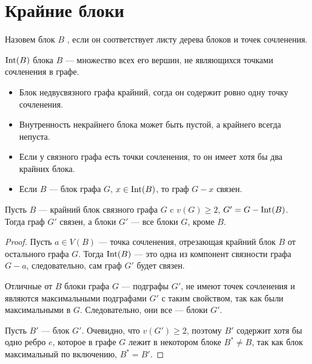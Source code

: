 \section{Крайние блоки}

\begin{definition}
    Назовем блок $B$ , если он соответствует листу дерева блоков и точек сочленения.
\end{definition}
\begin{definition}
     $\operatorname{Int}(B)$ блока $B$ --- множество всех его вершин, не являющихся точками сочленения в графе.
\end{definition}
\begin{itemize}
	\item Блок недвусвязного графа крайний, согда он содержит ровно одну точку сочленения.
	\item Внутренность некрайнего блока может быть пустой, а крайнего всегда непуста.
	\item Если у связного графа есть точки сочленения, то он имеет хотя бы два крайних блока.
	\item Если $B$ ---  блок графа $G$, $x \in \operatorname{Int}(B)$, то граф $G-x$ связен.
\end{itemize}
\begin{lemma}\label{lm:connectivity_3}
    Пусть $B$ --- крайний блок связного графа $G$ c $v(G) \ge 2$, $G' = G - \operatorname{Int}(B)$. Тогда граф $G'$ связен, а блоки $G'$ --- все блоки $G$, кроме $B$.
\end{lemma}
\begin{proof}
    Пусть $a \in V(B)$ --- точка сочленения, отрезающая крайний блок $B$ от остального графа $G$. Тогда $\operatorname{Int}(B)$ --- это одна из компонент связности графа  $G-a$, следовательно, сам граф $G'$ будет связен.

	Отличные от $B$ блоки графа $G$ --- подграфы $G'$, не имеют точек сочленения и являются максимальными подграфами $G'$ с таким свойством, так как были максимальными в $G$. Следовательно, они все --- блоки $G'$.

	Пусть $B'$ --- блок $G'$. Очевидно, что $v(G') \ge 2$, поэтому $B'$ содержит хотя бы одно ребро $e$, которое в графе $G$ лежит в некотором блоке $B^* \neq B$, так как блок максимальный по включению, $B^* = B'$.
\end{proof}
